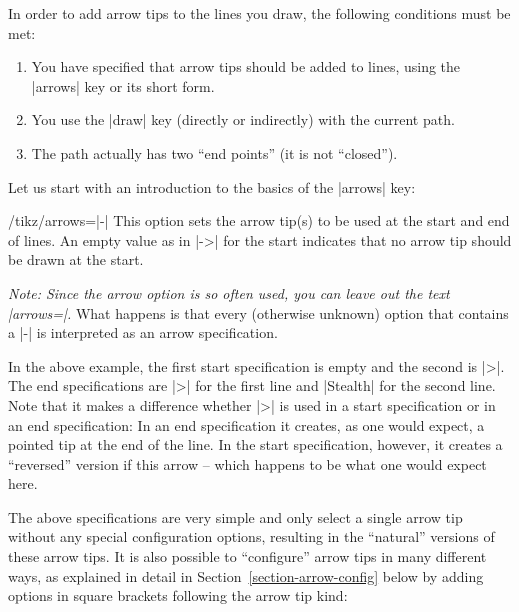 In order to add arrow tips to the lines you draw, the following
conditions must be met:

\begin{enumerate}
\item You have specified that arrow tips should be added to 
  lines, using the |arrows| key or its short form.
\item You use the |draw| key (directly or indirectly) with the current
  path. 
\item The path actually has two ``end points'' (it is not
  ``closed'').
\end{enumerate}

Let us start with an introduction to the basics of the |arrows| key: 

\begin{key}{/tikz/arrows=|-|} 
  This option sets the arrow tip(s) to be used at the start and end of
  lines. An empty value as in |->| for the start indicates that no
  arrow tip should be drawn at the start.%

  \emph{Note: Since the arrow option is so often used, you can leave
    out the text |arrows=|.} What happens is that every (otherwise
  unknown) option that contains a |-| is interpreted as an arrow specification.

\begin{codeexample}[]
\end{codeexample}

  In the above example, the first start specification is empty and the
  second is |>|. The end specifications are |>| for the first line and
  |Stealth| for the second line. Note that it makes a difference
  whether |>| is used in a start specification or in an end
  specification: In an end specification it creates, as one would
  expect, a pointed tip  at the end of the line. In the start
  specification, however, it creates a ``reversed'' version if this
  arrow -- which happens to be what one would expect here.

  The above specifications are very simple and only select a single
  arrow tip without any special configuration options, resulting in
  the ``natural'' versions of these arrow tips. It is also possible to
  ``configure'' arrow tips in many different ways, as explained in
  detail in Section~\ref{section-arrow-config} below by adding options
  in square brackets following the arrow tip kind:


\end{key}
